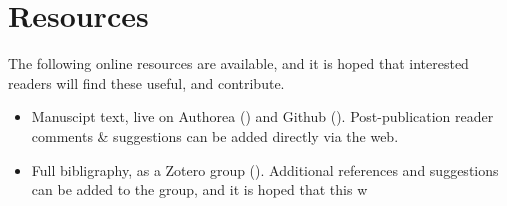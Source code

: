 \section{Resources}

The following online resources are available, and it is hoped that interested readers will find these useful, and contribute.

\begin{itemize}
\item Manuscipt text, live on Authorea () and Github (). Post-publication reader comments \& suggestions can be added directly via the web.
\item Full bibligraphy, as a Zotero group (). Additional references and suggestions can be added to the group, and it is hoped that this w
\end{itemize}